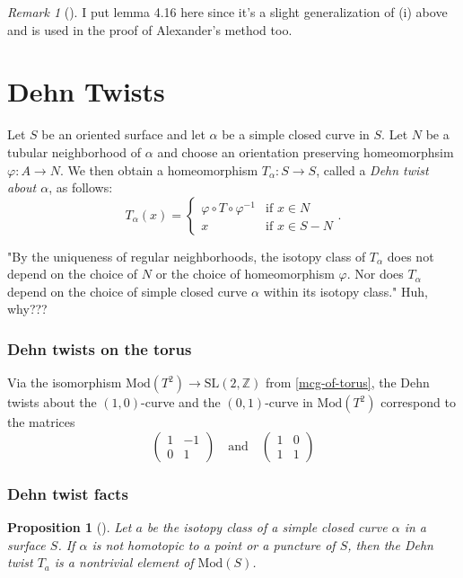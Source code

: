\documentclass[reqno]{amsart}
\newtheorem{proposition}[theorem]{Proposition}
\theoremstyle{definition}
\theoremstyle{remark}
\newtheorem*{remark}{Remark}
\newcommand{\SL}{{\mathrm{SL}}}
\newcommand{\Mod}{{\mathrm{Mod}}}
\begin{document}
\begin{remark}[]
    I put lemma 4.16 here since it's a slight generalization of
    (i) above and is used in the proof of Alexander's method
    too.
\end{remark}



\section{Dehn Twists}

Let $S$ be an oriented surface and let $\alpha$ be
a simple closed curve in $S$. Let $N$ be a tubular
neighborhood of $\alpha$ and choose
an orientation preserving homeomorphsim
$\varphi \colon A \to N$. We then obtain
a homeomorphism $T_{\alpha} \colon
S \to S$, called a \textit{Dehn twist about $\alpha$}, as
follows:
\[
T_{\alpha}(x) = 
\begin{cases}
    \varphi \circ T \circ \varphi^{-1}& \text{if } 
    x\in N \\
    x& \text{if } x\in S - N
\end{cases}.
\] 

"By the uniqueness of regular neighborhoods, the isotopy
class of $T_{\alpha}$ does not depend on the choice of
$N$ or the choice of homeomorphism $\varphi$. Nor
does $T_{\alpha}$ depend on the choice
of simple closed curve $\alpha$ within its isotopy class." 
Huh, why???


\subsubsection*{Dehn twists on the torus}
Via the isomorphism
$\Mod \left( T^2 \right)  \to \SL\left( 2, \mathbb{Z} \right) $ 
from \ref{mcg-of-torus}, the Dehn twists
about the $(1,0)$-curve and the $(0,1)$-curve
in $\Mod\left( T^2 \right) $ correspond to the
matrices
\[
    \begin{pmatrix} 1 & -1 \\ 0 & 1 \end{pmatrix} 
    \quad \text{and} \quad 
    \begin{pmatrix} 1 & 0 \\ 1 & 1 \end{pmatrix} 
\] 
\subsubsection{Dehn twist facts}

\begin{proposition}[]
    Let $a$ be the isotopy class of a simple closed curve
    $\alpha$ in a surface $S$. If $\alpha$ is not
    homotopic to a point or a puncture of $S$, then the
    Dehn twist $T_a$ is a nontrivial element of $\Mod(S)$.
\end{proposition}
\end{document}
